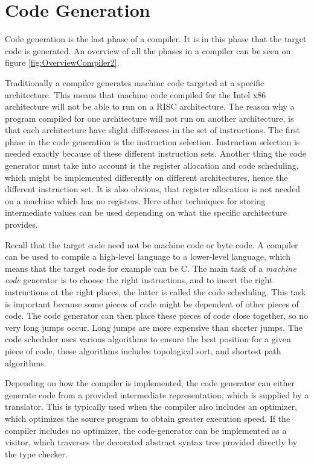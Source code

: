 \section{Code Generation}
\label{sec:theorycodegeneration}
Code generation is the last phase of a compiler. It is in this phase that the target code is generated. An overview of all the phases in a compiler can be seen on figure \ref{fig:OverviewCompiler2}.

Traditionally a compiler generates machine code targeted at a specific architecture. This means that machine code compiled for the Intel x86 architecture will not be able to run on a RISC architecture. The reason why a program compiled for one architecture will not run on another architecture, is that each architecture have slight differences in the set of instructions. The first phase in the code generation is the instruction selection. Instruction selection is needed exactly because of these different instruction sets. Another thing the code generator must take into account is the register allocation and code scheduling, which might be implemented differently on different architectures, hence the different instruction set. It is also obvious, that register allocation is not needed on a machine which has no registers. Here other techniques for storing intermediate values can be used depending on what the specific architecture provides.

Recall that the target code need not be machine code or byte code. A compiler can be used to compile a high-level language to a lower-level language, which means that the target code for example can be C. The main task of a \emph{machine code} generator is to choose the right instructions, and to insert the right instructions at the right places, the latter is called the code scheduling. This task is important because some pieces of code might be dependent of other pieces of code. The code generator can then place these pieces of code close together, so no very long jumps occur. Long jumps are more expensive than shorter jumps. The code scheduler uses various algorithms to ensure the best position for a given piece of code, these algorithms includes topological sort, and shortest path algorithms.

Depending on how the compiler is implemented, the code generator can either generate code from a provided intermediate representation, which is supplied by a translator. This is typically used when the compiler also includes an optimizer, which optimizes the source program to obtain greater execution speed. If the compiler includes no optimizer, the code-generator can be implemented as a visitor, which traverses the decorated abstract syntax tree provided directly by the type checker.